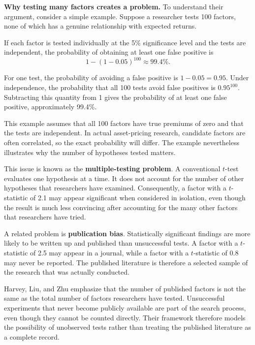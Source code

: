 \textbf{Why testing many factors creates a problem.}
To understand their argument, consider a simple example. Suppose
a researcher tests 100 factors, none of which has a genuine
relationship with expected returns. 

If each factor is tested individually at the 5\% significance level and the tests are independent, the probability of obtaining at least one false positive is
\begin{equation}
  1-(1-0.05)^{100} \approx 99.4\%. \nonumber
\end{equation}

For one test, the probability of avoiding a false positive is $1-0.05=0.95$. Under independence, the probability that all 100 tests avoid false positives is $0.95^{100}$. Subtracting this quantity from 1 gives the probability of at least one false positive, approximately 99.4\%.

This example assumes that all 100 factors have true premiums of zero and that the tests are independent. In actual asset-pricing research, candidate factors are often correlated, so the exact probability will differ. The example nevertheless illustrates why the number of hypotheses tested matters.

This issue is known as the \textbf{multiple-testing problem}.
 A conventional $t$-test
evaluates one hypothesis at a time. It does not account for the
number of other hypotheses that researchers have examined.
Consequently, a factor with a $t$-statistic of 2.1 may appear
significant when considered in isolation, even though the result
is much less convincing after accounting for the many other
factors that researchers have tried.

A related problem is \textbf{publication bias}. Statistically significant findings are more likely to be written up and published than unsuccessful tests. A factor with a $t$-statistic of 2.5 may appear in a journal, while a factor with a $t$-statistic of 0.8 may never be reported. The published literature is therefore a selected sample of the research that was actually conducted.

Harvey, Liu, and Zhu emphasize that the number of published factors is not the same as the total number of factors researchers have tested. Unsuccessful experiments that never become publicly available are part of the search process, even though they cannot be counted directly. Their framework therefore models the possibility of unobserved tests rather than treating the published literature as a complete record.

